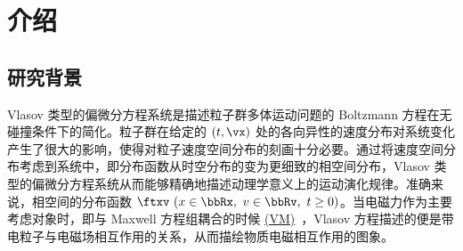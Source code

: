 \newcommand{\eqvp}{\hyperref[eq:vp]{(VP)}~}
\newcommand{\eqvm}{\hyperref[eq:vm]{(VM)}~}
\newcommand{\eqrvp}{\hyperref[eq:vp]{(RVP)}~}                      
\newcommand{\eqrvm}{\hyperref[eq:vm]{(RVM)}~}

\chapter{介绍}



\section{研究背景}

Vlasov 类型的偏微分方程系统是描述粒子群多体运动问题的 Boltzmann 方程在无碰撞条件下的简化。粒子群在给定的 $(t,\vx)$ 处的各向异性的速度分布对系统变化产生了很大的影响，使得对粒子速度空间分布的刻画十分必要。通过将速度空间分布考虑到系统中，即分布函数从时空分布的变为更细致的相空间分布，Vlasov 类型的偏微分方程系统从而能够精确地描述动理学意义上的运动演化规律。准确来说，相空间的分布函数 $\ftxv ~ (x\in \bbRx,~v\in\bbRv,~t\geq 0) $。当电磁力作为主要考虑对象时，即与 Maxwell 方程组耦合的时候 \eqvm，Vlasov 方程描述的便是带电粒子与电磁场相互作用的关系，从而描绘物质电磁相互作用的图象。




